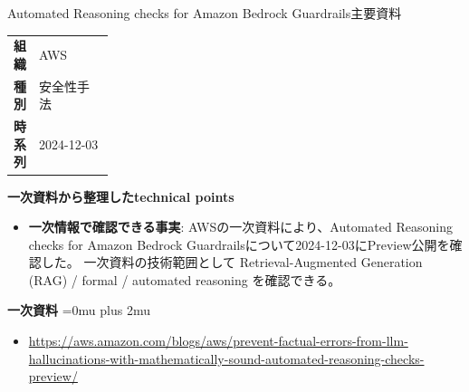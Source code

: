 \begin{technicalnote}{Automated Reasoning checks for Amazon Bedrock Guardrails}{主要資料}
\begingroup
\begin{tabularx}{\linewidth}{@{}>{\bfseries}p{0.22\linewidth}X@{}}
組織 & AWS \\
種別 & 安全性手法 \\
時系列 & 2024-12-03 \\
\end{tabularx}
\smallskip
{\bfseries 一次資料から整理したtechnical points}
\begin{itemize}[leftmargin=1.5em,itemsep=0.35em]
\item \textbf{一次情報で確認できる事実}: AWSの一次資料により、Automated Reasoning checks for Amazon Bedrock Guardrailsについて2024-12-03にPreview公開を確認した。 一次資料の技術範囲として Retrieval-Augmented Generation (RAG) / formal / automated reasoning を確認できる。
\end{itemize}
\begin{minipage}{\linewidth}
\begin{samepage}
{\bfseries 一次資料}
\begingroup\sloppy
\Urlmuskip=0mu plus 2mu\relax
\begin{itemize}[leftmargin=1.5em,itemsep=0.25em]
\item {\scriptsize\url{https://aws.amazon.com/blogs/aws/prevent-factual-errors-from-llm-hallucinations-with-mathematically-sound-automated-reasoning-checks-preview/}}
\end{itemize}
\endgroup
\end{samepage}
\end{minipage}
\endgroup
\end{technicalnote}
\medskip

